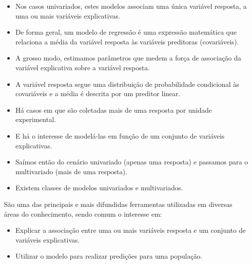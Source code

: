 \documentclass[10pt,
  aspectratio=169,
  serif,
  mathserif,
  professionalfont,
  compress,
  handout,
  ]{beamer}\usepackage[]{graphicx}\usepackage[]{color}
\begin{document}
\begin{frame}[c, allowframebreaks]

\begin{itemize}
  \item Nos casos univariados, estes modelos associam uma única variável resposta, a uma ou mais variáveis explicativas.

  \item De forma geral, um modelo de regressão é uma expressão matemática que relaciona a média da variável resposta às variáveis preditoras (covariáveis).
  
  \item A grosso modo, estimamos parâmetros que medem a força de associação da variável explicativa sobre a variável resposta.
  
  \item A variável resposta segue uma distribuição de probabilidade condicional às covariáveis e a média é descrita por um preditor linear.
\end{itemize}

\end{frame}

\begin{frame}[c, allowframebreaks]

\begin{itemize}
  \item Há casos em que são coletadas mais de uma resposta por unidade experimental.
  
  \item E há o interesse de modelá-las em função de um conjunto de variáveis explicativas.
  
  \item Saímos então do cenário univariado (apenas uma resposta) e passamos para o multivariado (mais de uma resposta).
  
  \item Existem classes de modelos univariados e multivariados.
  
\end{itemize}

\end{frame}

\begin{frame}[c, allowframebreaks]

São uma das principais e mais difundidas ferramentas utilizadas em diversas áreas do conhecimento, sendo comum o interesse em:

\begin{itemize}
  \item Explicar a associação entre uma ou mais variáveis resposta e um conjunto de variáveis explicativas.
  
  \item Utilizar o modelo para realizar predições para uma população.
\end{itemize}

\end{frame}
\end{document}
